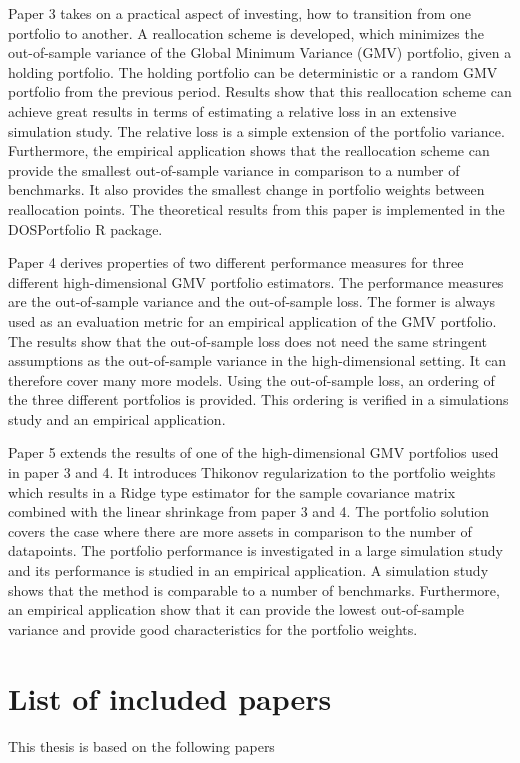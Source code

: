\documentclass[12pt, oneside]{book}\usepackage{knitr}
\begin{document}
{Paper 3 takes on a practical aspect of investing, how to transition from one portfolio to another.
A reallocation scheme is developed, which minimizes the out-of-sample variance of the Global Minimum Variance (GMV) portfolio, given a holding portfolio. 
The holding portfolio can be deterministic or a random GMV portfolio from the previous period.
Results show that this reallocation scheme can achieve great results in terms of estimating a relative loss in an extensive simulation study.
The relative loss is a simple extension of the portfolio variance.
Furthermore, the empirical application shows that the reallocation scheme can provide the smallest out-of-sample variance in comparison to a number of benchmarks.
It also provides the smallest change in portfolio weights between reallocation points.
The theoretical results from this paper is implemented in the DOSPortfolio R package.

Paper 4 derives properties of two different performance measures for three different high-dimensional GMV portfolio estimators. 
The performance measures are the out-of-sample variance and the out-of-sample loss.
The former is always used as an evaluation metric for an empirical application of the GMV portfolio.
The results show that the out-of-sample loss does not need the same stringent assumptions as the out-of-sample variance in the high-dimensional setting.
It can therefore cover many more models.
Using the out-of-sample loss, an ordering of the three different portfolios is provided.
This ordering is verified in a simulations study and an empirical application.

Paper 5 extends the results of one of the high-dimensional GMV portfolios used in paper 3 and 4. 
It introduces Thikonov regularization to the portfolio weights which results in a Ridge type estimator for the sample covariance matrix combined with the linear shrinkage from paper 3 and 4.
The portfolio solution covers the case where there are more assets in comparison to the number of datapoints.
The portfolio performance is investigated in a large simulation study and its performance is studied in an empirical application.
A simulation study shows that the method is comparable to a number of benchmarks. 
Furthermore, an empirical application show that it can provide the lowest out-of-sample variance and provide good characteristics for the portfolio weights.

\chapter*{List of included papers}
\nocite{bodnar2020sampling_thesis, javed2021tangency_thesis, bodnar2021dynamic_thesis, bodnar2021empirical_thesis, bodnar2022double_thesis, bodnar2021quantile_thesis, bodnar2020quantile_thesis, bodnar2021bayesian_thesis, DOSPortfolio_thesis}
This thesis is based on the following papers

}
\end{document}
